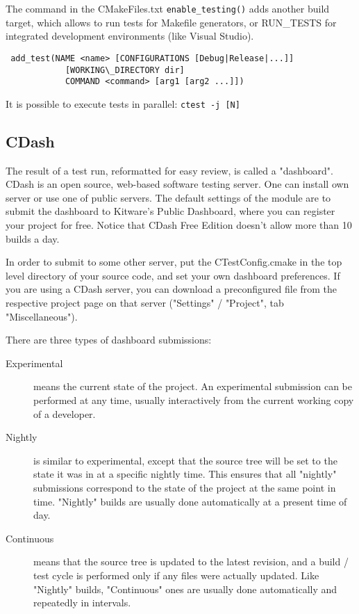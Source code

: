 \documentclass[a4paper,10pt]{article}
\begin{document}
The command in the CMakeFiles.txt \texttt{enable\_testing()} adds another build target, which allows to run tests for Makefile generators, or RUN\_TESTS for integrated development environments (like Visual Studio).



\begin{verbatim}
 add_test(NAME <name> [CONFIGURATIONS [Debug|Release|...]]
            [WORKING\_DIRECTORY dir]
            COMMAND <command> [arg1 [arg2 ...]])
\end{verbatim}

It is possible to execute tests in parallel:
\texttt{ctest -j [N]}

\subsection{CDash}

The result of a test run, reformatted for easy review, is called a "dashboard". CDash is an open source, web-based software testing server. One can install own server or use one of public servers.           
The default settings of the module are to submit the dashboard to Kitware's Public Dashboard, where you can register your project for free. Notice that CDash Free Edition doesn't allow more than 10 builds a day.

In order to submit to some other server, put the CTestConfig.cmake in the top level directory of your source code, and set your own dashboard preferences. If you are using a CDash server, you can download a preconfigured file from the respective project page on that server ("Settings" / "Project", tab "Miscellaneous").

There are three types of dashboard submissions:
\begin{description}
 \item[Experimental] means the current state of the project. An experimental submission can be performed at any time, usually interactively from the current working copy of a developer.
  \item[Nightly] is similar to experimental, except that the source tree will be set to the state it was in at a specific nightly time. This ensures that all "nightly" submissions correspond to the state of the project at the same point in time. "Nightly" builds are usually done automatically at a present time of day.
 \item[Continuous] means that the source tree is updated to the latest revision, and a build / test cycle is performed only if any files were actually updated. Like "Nightly" builds, "Continuous" ones are usually done automatically and repeatedly in intervals.
\end{description}
\end{document}
